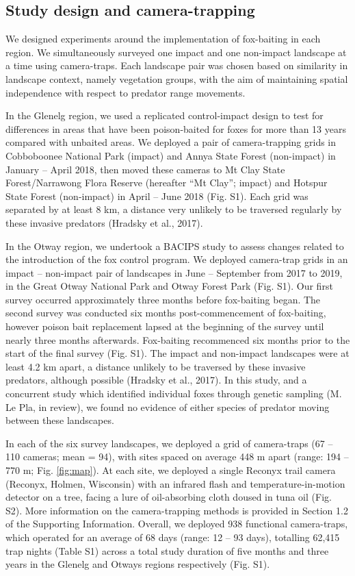 \documentclass[]{elsarticle} %
\begin{document}
\hypertarget{study-design-and-camera-trapping}{%
\subsection{Study design and camera-trapping}\label{study-design-and-camera-trapping}}

We designed experiments around the implementation of fox-baiting in each region. We simultaneously surveyed one impact and one non-impact landscape at a time using camera-traps. Each landscape pair was chosen based on similarity in landscape context, namely vegetation groups, with the aim of maintaining spatial independence with respect to predator range movements.

In the Glenelg region, we used a replicated control-impact design to test for differences in areas that have been poison-baited for foxes for more than 13 years compared with unbaited areas. We deployed a pair of camera-trapping grids in Cobboboonee National Park (impact) and Annya State Forest (non-impact) in January -- April 2018, then moved these cameras to Mt Clay State Forest/Narrawong Flora Reserve (hereafter ``Mt Clay''; impact) and Hotspur State Forest (non-impact) in April -- June 2018 (Fig. S1). Each grid was separated by at least 8 km, a distance very unlikely to be traversed regularly by these invasive predators (Hradsky et al., 2017).

In the Otway region, we undertook a BACIPS study to assess changes related to the introduction of the fox control program. We deployed camera-trap grids in an impact -- non-impact pair of landscapes in June -- September from 2017 to 2019, in the Great Otway National Park and Otway Forest Park (Fig. S1). Our first survey occurred approximately three months before fox-baiting began. The second survey was conducted six months post-commencement of fox-baiting, however poison bait replacement lapsed at the beginning of the survey until nearly three months afterwards. Fox-baiting recommenced six months prior to the start of the final survey (Fig. S1). The impact and non-impact landscapes were at least 4.2 km apart, a distance unlikely to be traversed by these invasive predators, although possible (Hradsky et al., 2017). In this study, and a concurrent study which identified individual foxes through genetic sampling (M. Le Pla, in review), we found no evidence of either species of predator moving between these landscapes.

In each of the six survey landscapes, we deployed a grid of camera-traps (67 -- 110 cameras; mean = 94), with sites spaced on average 448 m apart (range: 194 -- 770 m; Fig. \ref{fig:map}). At each site, we deployed a single Reconyx trail camera (Reconyx, Holmen, Wisconsin) with an infrared flash and temperature-in-motion detector on a tree, facing a lure of oil-absorbing cloth doused in tuna oil (Fig. S2). More information on the camera-trapping methods is provided in Section 1.2 of the Supporting Information. Overall, we deployed 938 functional camera-traps, which operated for an average of 68 days (range: 12 -- 93 days), totalling 62,415 trap nights (Table S1) across a total study duration of five months and three years in the Glenelg and Otways regions respectively (Fig. S1).
\end{document}
